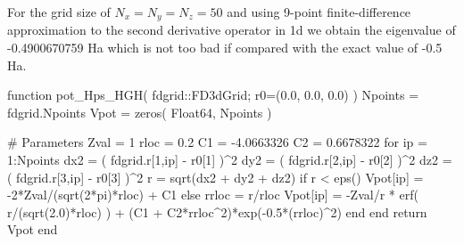 For the grid size of $N_{x}=N_{y}=N_{z}=50$ and using 9-point finite-difference approximation
to the second derivative operator in 1d we obtain the eigenvalue of -0.4900670759 Ha which
is not too bad if compared with the exact value of -0.5 Ha.

\begin{juliacode}
function pot_Hps_HGH( fdgrid::FD3dGrid; r0=(0.0, 0.0, 0.0) )
    Npoints = fdgrid.Npoints
    Vpot = zeros( Float64, Npoints )

    # Parameters
    Zval = 1
    rloc = 0.2
    C1 = -4.0663326
    C2 = 0.6678322
    for ip = 1:Npoints
        dx2 = ( fdgrid.r[1,ip] - r0[1] )^2
        dy2 = ( fdgrid.r[2,ip] - r0[2] )^2
        dz2 = ( fdgrid.r[3,ip] - r0[3] )^2
        r = sqrt(dx2 + dy2 + dz2)
        if r < eps()
            Vpot[ip] = -2*Zval/(sqrt(2*pi)*rloc) + C1
        else
            rrloc = r/rloc
            Vpot[ip] = -Zval/r * erf( r/(sqrt(2.0)*rloc) ) +
                     (C1 + C2*rrloc^2)*exp(-0.5*(rrloc)^2)
        end
    end
    return Vpot
end
\end{juliacode}
